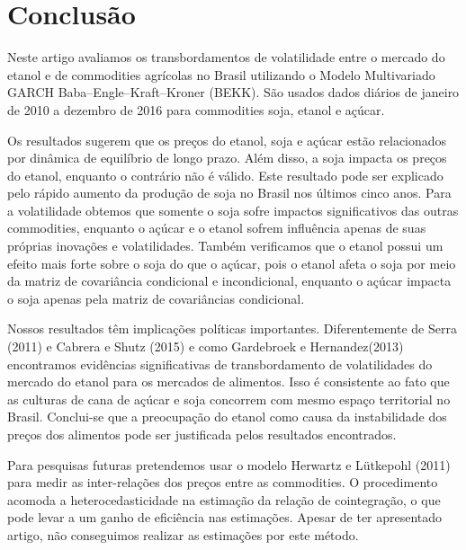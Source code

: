 \documentclass[a4paper,12pt] {article}
\begin{document}
	
	\section{Conclusão}

Neste artigo avaliamos os transbordamentos de volatilidade entre o mercado do etanol e de commodities agrícolas no Brasil utilizando o Modelo Multivariado GARCH Baba–Engle–Kraft–Kroner (BEKK). São usados dados diários de janeiro de 2010 a dezembro de 2016 para commodities soja, etanol e açúcar. 

Os resultados sugerem que os preços do etanol, soja e açúcar estão relacionados por dinâmica de equilíbrio de longo prazo. Além disso, a soja impacta os preços do etanol, enquanto o contrário não é válido. Este resultado pode ser explicado pelo rápido aumento da produção de soja no Brasil nos últimos cinco anos. Para a volatilidade obtemos que  somente o soja sofre impactos significativos das outras commodities, enquanto o açúcar e o etanol sofrem influência apenas de suas próprias inovações e volatilidades. Também verificamos que  o etanol possui um efeito mais forte sobre o soja do que o açúcar, pois o etanol afeta o soja por meio da matriz de covariância condicional e incondicional, enquanto o açúcar impacta o soja apenas pela matriz de covariâncias condicional.

Nossos resultados têm implicações políticas importantes. Diferentemente de Serra (2011) e Cabrera e Shutz (2015) e como Gardebroek e Hernandez(2013) encontramos evidências significativas de transbordamento de volatilidades do mercado do etanol para os mercados de alimentos. Isso é consistente ao fato que as culturas de cana de açúcar e soja concorrem com mesmo espaço territorial no Brasil. Conclui-se que a preocupação do etanol como causa da instabilidade dos preços dos alimentos pode ser justificada pelos resultados encontrados. 

Para pesquisas futuras pretendemos usar o modelo Herwartz e Lütkepohl (2011)  para medir as inter-relações dos preços entre as commodities. O procedimento  acomoda a heterocedasticidade na estimação da relação de cointegração, o que pode levar  a  um ganho de eficiência nas estimações. Apesar de ter apresentado artigo, não conseguimos realizar as estimações por este método.
\end{document}
